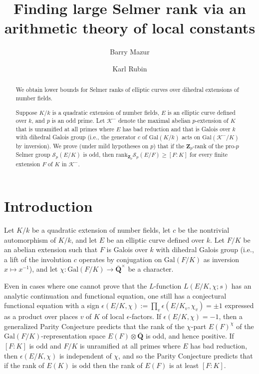 \documentclass[reqno]{amsart}
\title[Finding large Selmer rank]
{Finding large Selmer rank via an arithmetic theory of local constants}
\author{Barry Mazur}
\author{Karl Rubin}
\theoremstyle{definition}
\def\Z{\mathbf{Z}}
\def\Q{\mathbf{Q}}
\def\Zp{\Z_p}
\def\cS{\mathcal{S}}
\def\K{\mathcal{K}}
\def\Gal{\mathrm{Gal}}
\def\rk{\mathrm{rank}}
\def\Scp{\cS_p}
\def\k{k}
\begin{document}
\begin{abstract}
We obtain lower bounds for Selmer ranks of elliptic curves over dihedral
extensions of number fields.

Suppose $K/\k$ is a quadratic extension of number fields, 
$E$ is an elliptic curve defined over $\k$, and $p$ is an odd prime.  
Let $\K^-$ denote the maximal abelian $p$-extension of $K$ that is unramified 
at all primes where $E$ has bad reduction and that is Galois over $\k$ 
with dihedral Galois group (i.e., the generator $c$ of 
$\Gal(K/\k)$ acts on $\Gal(\K^-/K)$ by inversion).
We prove (under mild hypotheses on $p$) that if the $\Zp$-rank of 
the pro-$p$ Selmer group $\Scp(E/K)$ is odd, then 
$\rk_{\Zp} \Scp(E/F) \ge [F:K]$ for every finite extension $F$ of $K$ in $\K^-$.
\end{abstract}

\maketitle

\setcounter{tocdepth}{1}

\section*{Introduction}
\setcounter{section}{0}
Let $K/\k$ be a quadratic extension of number fields, let $c$ be the 
nontrivial automorphism of $K/\k$, and let $E$ be an elliptic curve 
defined over $\k$.  Let $F/K$ be an abelian extension 
such that $F$ is Galois over $\k$ with 
dihedral Galois group (i.e., a lift of the involution $c$ 
operates by conjugation on $\Gal(F/K)$ as inversion $x \mapsto x^{-1}$), and 
let $\chi : \Gal(F/K) \to \bar{\Q}^\times$ be a character.  

Even in cases where one cannot prove 
that the $L$-function $L(E/K,\chi; s)$ has an analytic continuation 
and functional equation, one still has a conjectural functional equation 
with a sign $\epsilon(E/K,\chi) := \prod_v \epsilon(E/K_v,\chi_v) = \pm 1$ expressed as 
a product over places $v$ of $K$ of local $\epsilon$-factors.  
If $\epsilon(E/K,\chi) = -1$, then a generalized Parity Conjecture predicts that the 
rank of the $\chi$-part $E(F)^\chi$ 
of the $\Gal(F/K)$-representation space $E(F)\otimes \bar{\Q}$ 
is odd, and hence positive.  
If $[F:K]$ is odd and 
$F/K$ is unramified at all primes where $E$ has bad reduction, 
then $\epsilon(E/K,\chi)$ is independent of $\chi$, and so 
the Parity Conjecture predicts that 
if the rank of $E(K)$ is odd then the rank of $E(F)$ is at least $[F:K]$.
\end{document}

